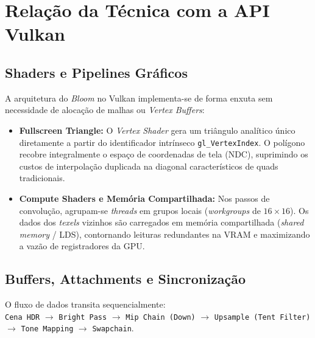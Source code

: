\documentclass[12pt,a4paper]{article}
\begin{document}
\section{Relação da Técnica com a API Vulkan}
\label{sec:vulkan}

\subsection{Shaders e Pipelines Gráficos}
A arquitetura do \textit{Bloom} no Vulkan implementa-se de forma enxuta sem necessidade de alocação de malhas ou \textit{Vertex Buffers}:
\begin{itemize}
    \item \textbf{Fullscreen Triangle:} O \textit{Vertex Shader} gera um triângulo analítico único diretamente a partir do identificador intrínseco \texttt{gl\_VertexIndex}. O polígono recobre integralmente o espaço de coordenadas de tela (NDC), suprimindo os custos de interpolação duplicada na diagonal característicos de quads tradicionais.
    \item \textbf{Compute Shaders e Memória Compartilhada:} Nos passos de convolução, agrupam-se \textit{threads} em grupos locais (\textit{workgroups} de $16 \times 16$). Os dados dos \textit{texels} vizinhos são carregados em memória compartilhada (\textit{shared memory} / LDS), contornando leituras redundantes na VRAM e maximizando a vazão de registradores da GPU.
\end{itemize}

\subsection{Buffers, Attachments e Sincronização}
O fluxo de dados transita sequencialmente:\\
\texttt{Cena HDR} $\to$ \texttt{Bright Pass} $\to$ \texttt{Mip Chain (Down)} $\to$ \texttt{Upsample (Tent Filter)} $\to$ \texttt{Tone Mapping} $\to$ \texttt{Swapchain}.
\end{document}
